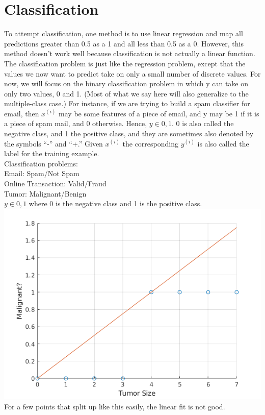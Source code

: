 \section{Classification}

To attempt classification, one method is to use linear regression and map all predictions greater than 0.5 as a 1 and all less than 0.5 as a 0. However, this method doesn't work well because classification is not actually a linear function.\\

The classification problem is just like the regression problem, except that the values we now want to predict take on only a small number of discrete values. For now, we will focus on the binary classification problem in which y can take on only two values, 0 and 1. (Most of what we say here will also generalize to the multiple-class case.) For instance, if we are trying to build a spam classifier for email, then $x^{(i)}$  may be some features of a piece of email, and y may be 1 if it is a piece of spam mail, and 0 otherwise. Hence, $y \in {0,1}$. 0 is also called the negative class, and 1 the positive class, and they are sometimes also denoted by the symbols “-” and “+.” Given $x^{(i)}$ the corresponding $y^{(i)}$ is also called the label for the training example.\\

Classification problems:\\
Email: Spam/Not Spam\\
Online Transaction: Valid/Fraud\\
Tumor: Malignant/Benign\\
$y \in {0,1}$ where 0 is the negative class and 1 is the positive class.\\

\includegraphics{matlab/classification.png}
For a few points that split up like this easily, the linear fit is not good.\\

